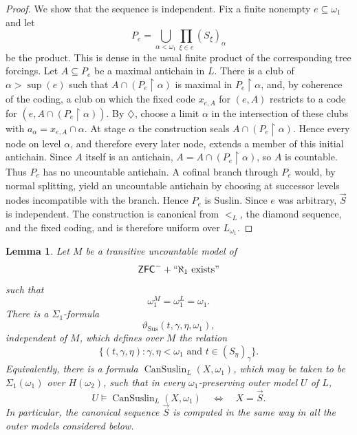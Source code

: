 \documentclass[a4paper,11pt]{article}
\newtheorem{lemma}[theorem]{Lemma}
\newcommand{\ZFCminus}{\mathsf{ZFC}^{-}}
\begin{document}
\begin{proof}
We show that the sequence is independent.  Fix a finite nonempty
$e\subseteq\omega_1$ and let
\[
   P_e=\bigcup_{\alpha<\omega_1}
      \prod_{\xi\in e}(S_\xi)_\alpha
\]
be the product.  This is dense in the usual finite product of the
corresponding tree forcings.  Let $A\subseteq P_e$ be a maximal antichain in
$L$.  There is a club of $\alpha>\sup(e)$ such that
$A\cap(P_e\restriction\alpha)$ is maximal in $P_e\restriction\alpha$, and,
by coherence of the coding, a club on which the fixed code $x_{e,A}$ for
$(e,A)$ restricts to a code for
$(e,A\cap(P_e\restriction\alpha))$.  By $\diamondsuit$, choose a limit
$\alpha$ in the intersection of these clubs with
$a_\alpha=x_{e,A}\cap\alpha$.  At stage $\alpha$ the construction seals
$A\cap(P_e\restriction\alpha)$.  Hence every node on level $\alpha$, and
therefore every later node, extends a member of this initial antichain.  Since
$A$ itself is an antichain, $A=A\cap(P_e\restriction\alpha)$, so $A$ is
countable.  Thus $P_e$ has no uncountable antichain.  A cofinal branch through
$P_e$ would, by normal splitting, yield an uncountable antichain by choosing at
successor levels nodes incompatible with the branch.  Hence $P_e$ is Suslin.
Since $e$ was arbitrary, $\vec S$ is independent.  The construction is
canonical from $<_L$, the diamond sequence, and the fixed coding, and is
therefore uniform over $L_{\omega_1}$.
\end{proof}

\begin{lemma}
\label{definabilityofvecS}
Let $M$ be a transitive uncountable model of
\[
   \ZFCminus+``\aleph_1\text{ exists}"
\]
such that
\[
   \omega_1^M=\omega_1^L=\omega_1.
\]
There is a $\Sigma_1$-formula
\[
   \vartheta_{\mathrm{Sus}}(t,\gamma,\eta,\omega_1),
\]
independent of $M$, which defines over $M$ the relation
\[
   \{(t,\gamma,\eta):
      \gamma,\eta<\omega_1\text{ and }t\in(S_\eta)_\gamma\}.
\]
Equivalently, there is a formula
$\operatorname{CanSuslin}_L(X,\omega_1)$, which may be taken to be
$\Sigma_1(\omega_1)$ over $H(\omega_2)$, such that in every
$\omega_1$-preserving outer model $U$ of $L$,
\[
   U\models\operatorname{CanSuslin}_L(X,\omega_1)
   \quad\Longleftrightarrow\quad X=\vec S.
\]
In particular, the canonical sequence $\vec S$ is computed in the same way in
all the outer models considered below.
\end{lemma}
\end{document}
